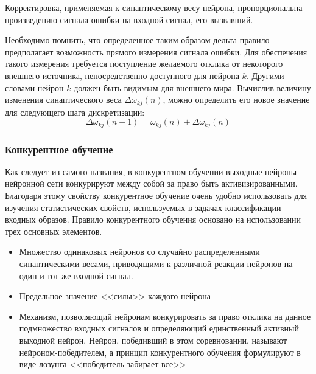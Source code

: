 Корректировка, применяемая к синаптическому весу нейрона, пропорциональна произведению сигнала ошибки на входной сигнал, его вызвавший.

Необходимо помнить, что  определенное таким образом дельта-правило предполагает возможность прямого измерения сигнала ошибки.
Для обеспечения такого измерения требуется поступление желаемого отклика от некоторого внешнего источника, непосредственно доступного для нейрона $k$.
Другими словами нейрон $k$ должен быть видимым для внешнего мира.
Вычислив величину изменения синаптического веса $\Delta\omega_{kj}(n)$, можно определить его новое значение для следующего шага дискретизации:
\begin{equation}
\Delta\omega_{kj}(n+1) = \omega_{kj}(n) +\Delta\omega_{kj}(n)
\end{equation}

\subsubsection{Конкурентное обучение}

Как следует из самого названия, в конкурентном обучении выходные нейроны нейронной сети конкурируют между собой за право быть активизированными.
Благодаря этому свойству конкурентное обучение очень удобно использовать для изучения статистических свойств, используемых в задачах классификации входных образов. 
Правило конкурентного обучения основано на использовании трех основных элементов.
\begin{itemize}
\item Множество одинаковых нейронов со случайно распределенными синаптическими весами, приводящими к различной реакции нейронов на один и тот же входной сигнал.
\item Предельное значение <<силы>> каждого нейрона
\item Механизм, позволяющий нейронам конкурировать за право отклика на данное подмножество входных сигналов  и определяющий единственный активный выходной нейрон.
Нейрон, победивший в этом соревновании, называют нейроном-победителем, а принцип конкурентного обучения формулируют в виде лозунга <<победитель забирает все>> 
\end{itemize}